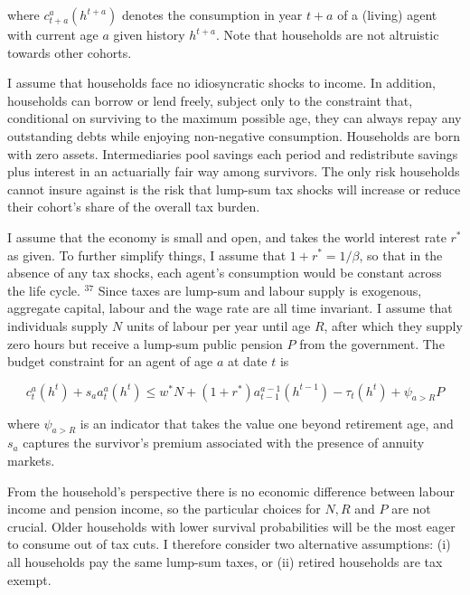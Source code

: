 \documentclass[11pt]{article}
\begin{document}
where $c_{t+a}^{a}\left(h^{t+a}\right)$ denotes the consumption in year $t+a$ of a (living) agent with current age $a$ given history $h^{t+a}$. Note that households are not altruistic towards other cohorts.

I assume that households face no idiosyncratic shocks to income. In addition, households can borrow or lend freely, subject only to the constraint that, conditional on surviving to the maximum possible age, they can always repay any outstanding debts while enjoying non-negative consumption. Households are born with zero assets. Intermediaries pool savings each period and redistribute savings plus interest in an actuarially fair way among survivors. The only risk households cannot insure against is the risk that lump-sum tax shocks will increase or reduce their cohort's share of the overall tax burden.

I assume that the economy is small and open, and takes the world interest rate $r^{*}$ as given. To further simplify things, I assume that $1+r^{*}=1 / \beta$, so that in the absence of any tax shocks, each agent's consumption would be constant across the life cycle. ${ }^{37}$ Since taxes are lump-sum and labour supply is exogenous, aggregate capital, labour and the wage rate are all time invariant. I assume that individuals supply $N$ units of labour per year until age $R$, after which they supply zero hours but receive a lump-sum public pension $P$ from the government. The budget constraint for an agent of age $a$ at date $t$ is


\begin{equation*}
c_{t}^{a}\left(h^{t}\right)+s_{a} a_{t}^{a}\left(h^{t}\right) \leq w^{*} N+\left(1+r^{*}\right) a_{t-1}^{a-1}\left(h^{t-1}\right)-\tau_{t}\left(h^{t}\right)+\psi_{a>R} P \tag{A.1}
\end{equation*}


where $\psi_{a>R}$ is an indicator that takes the value one beyond retirement age, and $s_{a}$ captures the survivor's premium associated with the presence of annuity markets.

From the household's perspective there is no economic difference between labour income and pension income, so the particular choices for $N, R$ and $P$ are not crucial. Older households with lower survival probabilities will be the most eager to consume out of tax cuts. I therefore consider two alternative assumptions: (i) all households pay the same lump-sum taxes, or (ii) retired households are tax exempt.
\end{document}
